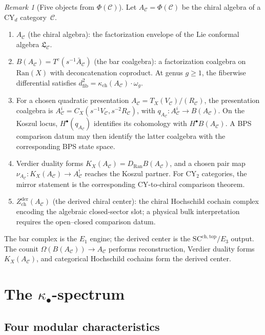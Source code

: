 \documentclass[11pt]{article}
\theoremstyle{plain}
\theoremstyle{definition}
\theoremstyle{remark}
\newtheorem{remark}[theorem]{Remark}
\newcommand{\fL}{\mathfrak{L}}
\newcommand{\Ran}{\mathrm{Ran}}
\newcommand{\cC}{\mathcal{C}}
\newcommand{\Eone}{E_1}
\newcommand{\Zder}{Z^{\mathrm{der}}_{\mathrm{ch}}}
\newcommand{\SCchtop}{\mathrm{SC}^{\mathrm{ch},\mathrm{top}}}
\begin{document}
\begin{remark}[Five objects from $\Phi(\cC)$]
\label{rem:v3-st-five-objects}
Let $A_\cC = \Phi(\cC)$ be the chiral algebra of a CY$_d$
category~$\cC$.
\begin{enumerate}[label=(\roman*)]
 \item $A_\cC$ (the chiral algebra): the factorization envelope
 of the Lie conformal algebra $\fL_\cC$.
 \item $B(A_\cC) = T^c(s^{-1}\bar{A}_\cC)$ (the bar coalgebra):
 a factorization coalgebra on $\Ran(X)$ with deconcatenation
 coproduct.  At genus $g \geq 1$, the fiberwise differential
 satisfies $d_{\mathrm{fib}}^2 = \kappa_{\mathrm{ch}}(A_\cC)
 \cdot \omega_g$.
 \item For a chosen quadratic presentation
 $A_\cC=T_X(V_\cC)/(R_\cC)$, the presentation coalgebra is
 $A_\cC^i=C_X(s^{-1}V_\cC,s^{-2}R_\cC)$, with
 $q_{A_\cC}\colon A_\cC^i\to B(A_\cC)$.  On the Koszul locus,
 $H^\bullet(q_{A_\cC})$ identifies its cohomology with
 $H^\bullet B(A_\cC)$.  A BPS comparison datum may then identify
 the latter coalgebra with the corresponding BPS state space.
 \item Verdier duality forms
 $K_X(A_\cC)=D_{\Ran}B(A_\cC)$, and a chosen pair map
 $\nu_{A_\cC}\colon K_X(A_\cC)\to A_\cC^!$ reaches the Koszul partner.
 For CY$_2$ categories, the mirror statement is the corresponding
 CY-to-chiral comparison theorem.
 \item $\Zder(A_\cC)$ (the derived chiral center):
 the chiral Hochschild cochain complex encoding the algebraic
 closed-sector slot; a physical bulk interpretation requires the
 open--closed comparison datum.
\end{enumerate}
The bar complex is the $\Eone$ engine; the derived center is the
$\SCchtop/E_3$ output.  The counit
$\Omega(B(A_\cC))\to A_\cC$ performs reconstruction, Verdier duality
forms $K_X(A_\cC)$, and categorical Hochschild cochains form the
derived center.
\end{remark}



\section{The $\kappa_\bullet$-spectrum}
\label{sec:kappa-spectrum}

\subsection{Four modular characteristics}
\end{document}
